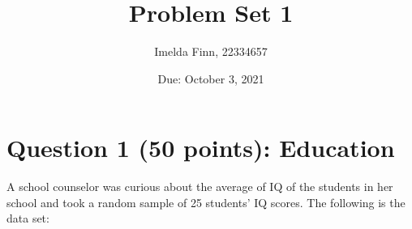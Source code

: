 \documentclass[12pt,letterpaper]{article}
\title{Problem Set 1}
\date{Due: October 3, 2021}
\author{Imelda Finn, 22334657}
\begin{document}
	\maketitle

\begin{comment}	
	\section*{Instructions}
	\begin{itemize}
		\item Please show your work! You may lose points by simply writing in the answer. If the problem requires you to execute commands in \texttt{R}, please include the code you used to get your answers. Please also include the \texttt{.R} file that contains your code. If you are not sure if work needs to be shown for a particular problem, please ask.
		\item Your homework should be submitted electronically on GitHub in \texttt{.pdf} form.
		\item This problem set is due before 8:00 on Friday October 3, 2021. No late assignments will be accepted.
		\item Total available points for this homework is 100.
	\end{itemize}
\end{comment}


	\vspace{1cm}
	\section*{Question 1 (50 points): Education}
	
	A school counselor was curious about the average of IQ of the students in her school and took a random sample of 25 students' IQ scores. The following is the data set:\\
	\vspace{.5cm}
	
	  
	
	\vspace{1cm}
	
\end{document}

